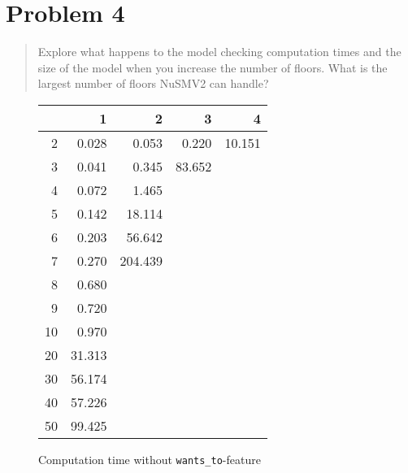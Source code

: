 \documentclass[a4paper,10pt]{article}
\begin{document}
	\section{Problem 4}
	
	\begin{quote}
		Explore what happens to the model checking computation times and the size of the model when you increase the number of floors. What is the largest number of floors NuSMV2 can handle?
	\end{quote}
	
	\begin{figure}[H]
		\begin{center}
			\begin{tabular}{r|r|r|r|r}
				\backslashbox{$F$}{$n$} & 1 & 2 & 3 & 4 \\ \hline
				2	& 0.028		& 0.053		& 0.220		& 10.151	\\ \hline
				3	& 0.041		& 0.345		& 83.652	&			\\ \hline
				4	& 0.072		& 1.465		&			&			\\ \hline
				5	& 0.142		& 18.114	&			&			\\ \hline
				6	& 0.203		& 56.642	&			&			\\ \hline 
				7	& 0.270		& 204.439	&			&			\\ \hline
				8	& 0.680		&			&			&			\\ \hline
				9	& 0.720		&			&			&			\\ \hline
				10	& 0.970		&			&			&			\\ \hline
				20	& 31.313	&			&			&			\\ \hline
				30	& 56.174	&			&			&			\\ \hline
				40	& 57.226	&			&			&			\\ \hline
				50	& 99.425	&			&			&			\\ \hline
			\end{tabular}
		\end{center}
		
		\caption{Computation time without \texttt{wants\_to}-feature}
	\end{figure}
	
\end{document}
